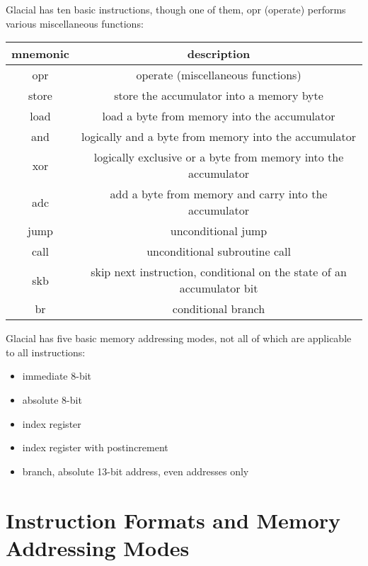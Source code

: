 \documentclass[letterpaper]{report}
\begin{document}
\bigskip

Glacial has ten basic instructions, though one of them, opr (operate)
performs various miscellaneous functions:

\bigskip

\begin{tabular}{ | c | c | }
  \hline
  mnemonic & description \\
  \hline \hline
  opr      & operate (miscellaneous functions) \\
  \hline
  store    & store the accumulator into a memory byte \\
  \hline
  load     & load a byte from memory into the accumulator \\
  \hline
  and      & logically and a byte from memory into the accumulator \\
  \hline
  xor      & logically exclusive or a byte from memory into the accumulator \\
  \hline
  adc      & add a byte from memory and carry into the accumulator \\
  \hline
  jump     & unconditional jump \\
  \hline
  call     & unconditional subroutine call \\
  \hline
  skb      & skip next instruction, conditional on the state of an accumulator bit \\
  \hline
  br       & conditional branch \\
  \hline
\end{tabular}

\bigskip

Glacial has five basic memory addressing modes, not all of which are
applicable to all instructions:

\bigskip

\begin{itemize}
  \item immediate 8-bit
  \item absolute 8-bit
  \item index register
  \item index register with postincrement
  \item branch, absolute 13-bit address, even addresses only
\end{itemize}

\chapter{Instruction Formats and Memory Addressing Modes}
\end{document}
